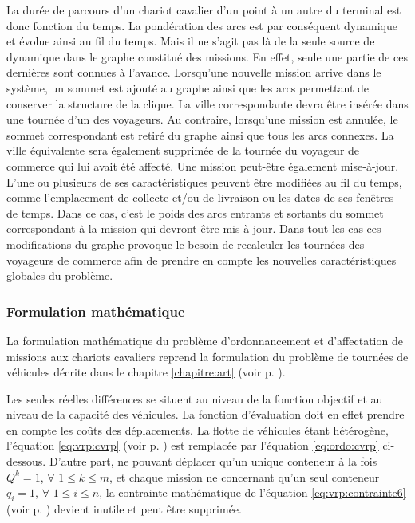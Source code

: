 La durée de parcours d'un chariot cavalier d'un point à un autre du terminal est donc fonction du temps. La pondération des arcs est par conséquent dynamique et évolue ainsi au fil du temps. Mais il ne s'agit pas là de la seule source de dynamique dans le graphe constitué des missions. En effet, seule une partie de ces dernières sont connues à l'avance. Lorsqu'une nouvelle mission arrive dans le système, un sommet est ajouté au graphe ainsi que les arcs permettant de conserver la structure de la clique. La ville correspondante devra être insérée dans une tournée d'un des voyageurs.
Au contraire, lorsqu'une mission est annulée, le sommet correspondant est retiré du graphe ainsi que tous les arcs connexes. La ville équivalente sera également supprimée de la tournée du voyageur de commerce qui lui avait été affecté.
Une mission peut-être également mise-à-jour. L'une ou plusieurs de ses caractéristiques peuvent être modifiées au fil du temps, comme l'emplacement de collecte et/ou de livraison ou les dates de ses fenêtres de temps. Dans ce cas, c'est le poids des arcs entrants et sortants du sommet correspondant à la mission qui devront être mis-à-jour.
Dans tout les cas ces modifications du graphe provoque le besoin de recalculer les tournées des voyageurs de commerce afin de prendre en compte les nouvelles caractéristiques globales du problème.

\subsubsection{Formulation mathématique}

La formulation mathématique du problème d'ordonnancement et d'affectation de missions aux chariots cavaliers reprend la formulation du problème de tournées de véhicules décrite dans le chapitre \ref{chapitre:art} (voir p. \pageref{sec:vrp:modelMath}).

Les seules réelles différences se situent au niveau de la fonction objectif et au niveau de la capacité des véhicules. La fonction d'évaluation doit en effet prendre en compte les coûts des déplacements. La flotte de véhicules étant hétérogène, l'équation \ref{eq:vrp:cvrp} (voir p. \pageref{eq:vrp:cvrp}) est remplacée par l'équation \ref{eq:ordo:cvrp} ci-dessous.
D'autre part, ne pouvant déplacer qu'un unique conteneur à la fois $Q^k = 1$, $\forall$  $1 \leq k \leq m$, et chaque mission ne concernant qu'un seul conteneur $q_i = 1$, $\forall$ $1 \leq i \leq n$, la contrainte mathématique de l'équation \ref{eq:vrp:contrainte6} (voir p. \pageref{eq:vrp:contrainte6}) devient inutile et peut être supprimée.

